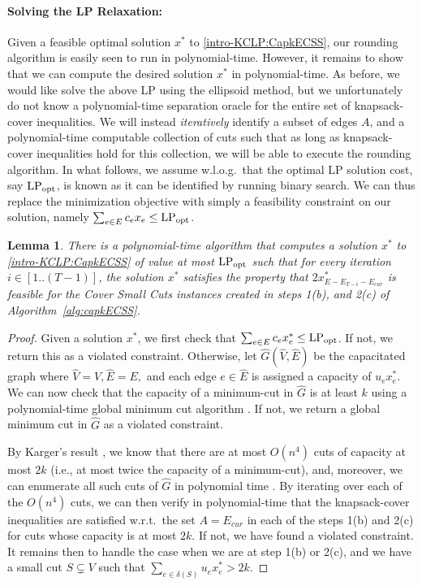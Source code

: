 \documentclass[11pt]{article}
\newtheorem{lemma}[theorem]{Lemma}
\newcommand\lpopt{\hbox{\text{LP}$_{\text{opt}}$}}
\newcommand\hG{\hat{G}}
\newcommand\hE{\hat{E}}
\newcommand\hV{\hat{V}}
\begin{document}
{\paragraph{Solving the LP Relaxation:} 
Given a feasible optimal solution $x^*$ to \eqref{intro-KCLP:CapkECSS}, our rounding algorithm is easily seen to run in polynomial-time. However, it remains to show that we can compute the desired solution  $x^*$ in polynomial-time.
As before, we would like solve the above LP using the ellipsoid method, but we unfortunately do not know a polynomial-time separation oracle for the entire set of knapsack-cover inequalities. We will instead {\em iteratively} identify a subset of edges $A$, and a polynomial-time computable collection of cuts such that as long as knapsack-cover inequalities hold for this collection, we will be able to execute the rounding algorithm. In what follows, we assume w.l.o.g.\ that the optimal LP solution cost, say $\lpopt$, is known as it can be identified by running binary search. We can thus replace the minimization objective with simply a feasibility constraint on our solution, namely $\sum_{e\in E}c_e x_e \leq \lpopt$.


\begin{lemma}\label{lem:polytimeKC_CapkECSS}
There is a polynomial-time algorithm that computes a solution $x^*$ to \eqref{intro-KCLP:CapkECSS} of value at most $\lpopt$ such that for every iteration $i \in [1..(T-1)]$, the solution $x^*$ satisfies the property that $2x^*_{E-E_{T-i} - E_{cur}}$ is feasible for the Cover Small Cuts instances created in steps 1(b), and 2(c) of Algorithm~\ref{alg:capkECSS}. 
\end{lemma}
\begin{proof}
Given a solution $x^*$, we first check that $\sum_{e \in E} c_e x_e^* \le \lpopt$. If not, we return this as a violated constraint. Otherwise, let $\hG(\hV,\hE)$ be the capacitated graph where $\hV=V,\hE=E,$ and each edge $e \in \hE$ is assigned a capacity of $u_ex_e^*$. We can now check that the capacity of a minimum-cut in $\hG$ is at least $k$ using a polynomial-time global minimum cut algorithm \cite{Schrijver-book}.  If not, we return a global minimum cut in $\hG$ as a violated constraint. 

By Karger's result \cite{Karger93}, we know that there are at most $O(n^4)$ cuts of capacity at most $2k$ (i.e., at most twice the capacity of a minimum-cut), and, moreover, we can enumerate all such cuts of $\hG$ in polynomial time \cite{NNI97}.
By iterating over each of the $O(n^4)$ cuts, we can then verify in polynomial-time that the knapsack-cover inequalities are satisfied w.r.t.\ the set $A = E_{cur}$ in each of the steps 1(b) and 2(c) for cuts whose capacity is at most $2k$. If not, we have found a violated constraint. It remains then to handle the case when we are at step 1(b) or 2(c), and we have a small cut $S \subsetneq V$ such that $ \sum_{e \in \delta(S)} u_e x^*_e > 2k.$


\end{proof}}
\end{document}
